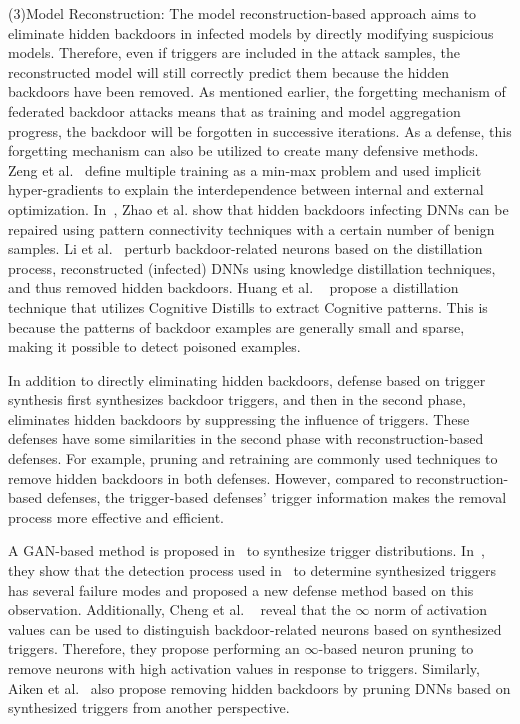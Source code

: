 \documentclass[a4paper,fleqn]{cas-dc}
\begin{document}
(3)Model Reconstruction: The model reconstruction-based
approach aims to eliminate hidden backdoors in infected
models by directly modifying suspicious models.
Therefore, even if triggers are included in the attack
samples, the reconstructed model will still correctly predict
them because the hidden backdoors have been removed. As mentioned earlier, the forgetting mechanism of
federated backdoor attacks means that as training and
model aggregation progress, the backdoor will be forgotten
in successive iterations. As a defense, this forgetting
mechanism can also be utilized to create many defensive
methods. Zeng et al.~\cite{zeng2021adversarial} define multiple training as a min-max
problem and used implicit hyper-gradients to explain the
interdependence between internal and external optimization.
In~\cite{zhao2020bridging}, Zhao et al. show that hidden backdoors
infecting DNNs can be repaired using pattern connectivity
techniques with a certain number of benign samples. Li et al.~\cite{yoshida2020disabling} perturb backdoor-related neurons based
on the distillation process, reconstructed (infected) DNNs
using knowledge distillation techniques, and
thus removed hidden backdoors. Huang et al. ~\cite{huang2023distilling} propose a
distillation technique that utilizes Cognitive Distills to
extract Cognitive patterns. This is because the patterns of
backdoor examples are generally small and sparse, making
it possible to detect poisoned examples.

In addition to directly eliminating hidden backdoors,
defense based on trigger synthesis first synthesizes
backdoor triggers, and then in the second phase, eliminates
hidden backdoors by suppressing the influence of triggers.
These defenses have some similarities in the second phase
with reconstruction-based defenses. For example, pruning
and retraining are commonly used techniques to remove
hidden backdoors in both defenses. However, compared to
reconstruction-based defenses, the trigger-based defenses'
trigger information makes the removal process more effective and eﬀicient.

A GAN-based method is proposed in~\cite{zhu2020gangsweep} to synthesize
trigger distributions. In~\cite{guo2020towards}, they show that the detection
process used in~\cite{wang2019neural} to determine synthesized triggers has
several failure modes and proposed a new defense method
based on this observation. Additionally, Cheng et al. ~\cite{xu2020defending}
reveal that the $\infty$ norm of activation values can be used to
distinguish backdoor-related neurons based on synthesized
triggers. Therefore, they propose performing an $\infty$-based
neuron pruning to remove neurons with high activation
values in response to triggers. Similarly, Aiken et al.~\cite{aiken2021neural}
also propose removing hidden backdoors by pruning DNNs
based on synthesized triggers from another perspective.
\end{document}
